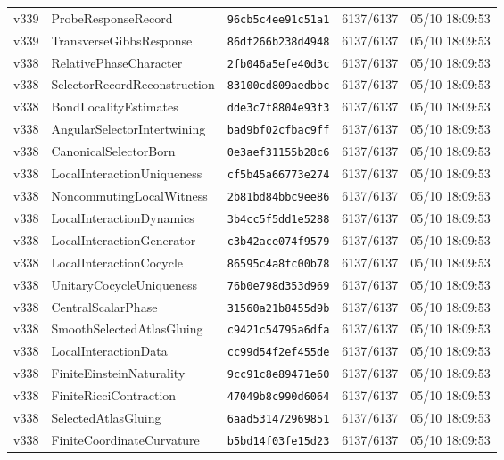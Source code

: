 \documentclass[11pt]{article}
\theoremstyle{definition}\newtheorem{deriv}{Derivation}
\begin{document}
{\begin{longtable}{@{}lllll@{}}
v339 & ProbeResponseRecord & \texttt{96cb5c4ee91c51a1} & 6137/6137 & 05/10 18:09:53 \\
v339 & TransverseGibbsResponse & \texttt{86df266b238d4948} & 6137/6137 & 05/10 18:09:53 \\
v338 & RelativePhaseCharacter & \texttt{2fb046a5efe40d3c} & 6137/6137 & 05/10 18:09:53 \\
v338 & SelectorRecordReconstruction & \texttt{83100cd809aedbbc} & 6137/6137 & 05/10 18:09:53 \\
v338 & BondLocalityEstimates & \texttt{dde3c7f8804e93f3} & 6137/6137 & 05/10 18:09:53 \\
v338 & AngularSelectorIntertwining & \texttt{bad9bf02cfbac9ff} & 6137/6137 & 05/10 18:09:53 \\
v338 & CanonicalSelectorBorn & \texttt{0e3aef31155b28c6} & 6137/6137 & 05/10 18:09:53 \\
v338 & LocalInteractionUniqueness & \texttt{cf5b45a66773e274} & 6137/6137 & 05/10 18:09:53 \\
v338 & NoncommutingLocalWitness & \texttt{2b81bd84bbc9ee86} & 6137/6137 & 05/10 18:09:53 \\
v338 & LocalInteractionDynamics & \texttt{3b4cc5f5dd1e5288} & 6137/6137 & 05/10 18:09:53 \\
v338 & LocalInteractionGenerator & \texttt{c3b42ace074f9579} & 6137/6137 & 05/10 18:09:53 \\
v338 & LocalInteractionCocycle & \texttt{86595c4a8fc00b78} & 6137/6137 & 05/10 18:09:53 \\
v338 & UnitaryCocycleUniqueness & \texttt{76b0e798d353d969} & 6137/6137 & 05/10 18:09:53 \\
v338 & CentralScalarPhase & \texttt{31560a21b8455d9b} & 6137/6137 & 05/10 18:09:53 \\
v338 & SmoothSelectedAtlasGluing & \texttt{c9421c54795a6dfa} & 6137/6137 & 05/10 18:09:53 \\
v338 & LocalInteractionData & \texttt{cc99d54f2ef455de} & 6137/6137 & 05/10 18:09:53 \\
v338 & FiniteEinsteinNaturality & \texttt{9cc91c8e89471e60} & 6137/6137 & 05/10 18:09:53 \\
v338 & FiniteRicciContraction & \texttt{47049b8c990d6064} & 6137/6137 & 05/10 18:09:53 \\
v338 & SelectedAtlasGluing & \texttt{6aad531472969851} & 6137/6137 & 05/10 18:09:53 \\
v338 & FiniteCoordinateCurvature & \texttt{b5bd14f03fe15d23} & 6137/6137 & 05/10 18:09:53 \\

\end{longtable}}
\end{document}

